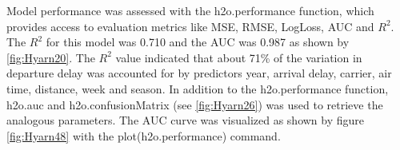 \documentclass[12pt,twoside]{amherstthesis}
\begin{document}
  Model performance was assessed with the h2o.performance function, which
  provides access to evaluation metrics like MSE, RMSE, LogLoss, AUC and
  \(R^{2}\). The \(R^{2}\) for this model was 0.710 and the AUC was 0.987
  as shown by \autoref{fig:Hyarn20}. The \(R^{2}\) value indicated that
  about 71\% of the variation in departure delay was accounted for by
  predictors year, arrival delay, carrier, air time, distance, week and
  season. In addition to the h2o.performance function, h2o.auc and
  h2o.confusionMatrix (see \autoref{fig:Hyarn26}) was used to retrieve the
  analogous parameters. The AUC curve was visualized as shown by figure
  \autoref{fig:Hyarn48} with the plot(h2o.performance) command.
  
  \begin{Shaded}
  \begin{Highlighting}[]
  \StringTok{ }\NormalTok{(mat$No[}\NormalTok{]+mat$Yes[}\NormalTok{])/(mat$No[}\NormalTok{]+}
  \StringTok{                                      }\NormalTok{mat$No[}\NormalTok{]+mat$Yes[}\NormalTok{]+}
  \StringTok{                                      }\NormalTok{mat$Yes[}\NormalTok{]) }
  \NormalTok{(}
  \end{Highlighting}
  \end{Shaded}
  
\end{document}
